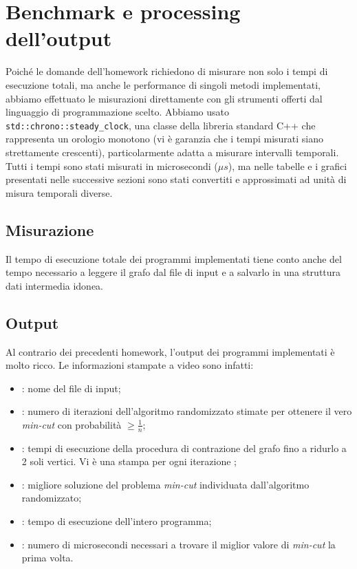 \section{Benchmark e processing dell'output}
\label{cap:benchmark-process}

Poiché le domande dell'homework richiedono di misurare non solo i tempi di esecuzione totali, ma anche le performance
di singoli metodi implementati, abbiamo effettuato le misurazioni direttamente con gli strumenti offerti dal linguaggio di programmazione scelto. Abbiamo usato \texttt{std::chrono::steady_clock}, una classe della libreria standard C++ che rappresenta un orologio monotono (vi è garanzia che i tempi misurati siano strettamente crescenti), particolarmente adatta a misurare intervalli temporali. Tutti i tempi sono stati misurati in microsecondi ($\mu{}s$), ma nelle tabelle e i grafici presentati nelle successive sezioni sono stati convertiti e approssimati ad unità di misura temporali diverse.

\subsection{Misurazione}

Il tempo di esecuzione totale dei programmi implementati tiene conto anche del tempo necessario a leggere il grafo dal file di input e a salvarlo in una struttura dati intermedia idonea.

\subsection{Output}
\label{sub:output}

Al contrario dei precedenti homework, l'output dei programmi implementati è molto ricco. Le informazioni stampate a video sono infatti:

\begin{itemize}
    \item {}: nome del file di input;
    \item {}: numero di iterazioni dell'algoritmo randomizzato stimate per ottenere il vero \textit{min-cut} con probabilità $\geq \frac{1}{n}$;
    \item {}: tempi di esecuzione della procedura di contrazione del grafo fino a ridurlo a 2 soli vertici. Vi è una stampa per ogni iterazione ;
    \item {}: migliore soluzione del problema \textit{min-cut} individuata dall'algoritmo randomizzato;
    \item {}: tempo di esecuzione dell'intero programma;
    \item {}: numero di microsecondi necessari a trovare il miglior valore di \textit{min-cut} la prima volta.
\end{itemize}

